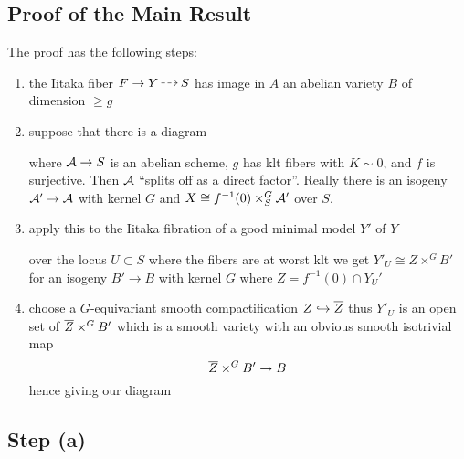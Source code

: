 \documentclass[12pt]{article}
\begin{document}
\subsection{Proof of the Main Result}

The proof has the following steps:

\begin{enumerate}
\item the Iitaka fiber $F \to Y \rat S$ has image in $A$ an abelian variety $B$ of dimension $\ge g$
\item suppose that there is a diagram
\begin{center}
\end{center}
where $\mathcal{A} \to S$ is an abelian scheme, $g$ has klt fibers with $K \sim 0$, and $f$ is surjective. Then $\mathcal{A}$ ``splits off as a direct factor''. Really there is an isogeny $\mathcal{A}' \to \mathcal{A}$ with kernel $G$ and $X \cong f^{-1}(0) \times^G_S \mathcal{A}'$ over $S$.
\item apply this to the Iitaka fibration of a good minimal model $Y'$ of $Y$
\begin{center}
\end{center}
over the locus $U \subset S$ where the fibers are at worst klt we get $Y'_U \cong Z \times^G B'$ for an isogeny $B' \to B$ with kernel $G$ where $Z = f^{-1}(0) \cap Y_U'$
\item choose a $G$-equivariant smooth compactification $Z \hookrightarrow \overline{Z}$ thus $Y'_U$ is an open set of $\overline{Z} \times^G B'$ which is a smooth variety with an obvious smooth isotrivial map
\[ \overline{Z} \times^G B' \to B \]
hence giving our diagram
\begin{center}
\end{center}
\end{enumerate}

\subsection{Step (a)}
\end{document}
